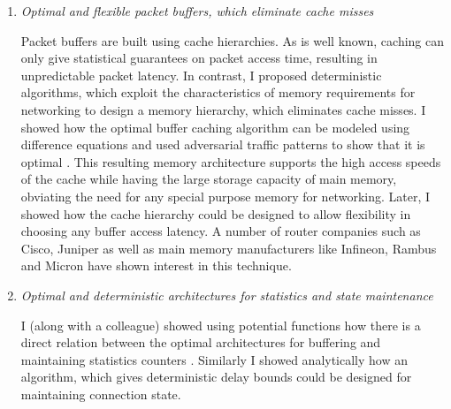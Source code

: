 \documentclass[11pt, a4paper]{article}
\begin{document}
\begin{small}
\begin{enumerate}
\item {\em Optimal and flexible packet buffers, which eliminate cache misses}


Packet buffers are built using cache hierarchies. As is well known, caching
can only give statistical guarantees on packet access time, resulting in unpredictable packet
latency.
In contrast, I proposed deterministic algorithms, which exploit the characteristics 
of memory requirements for networking to design a memory hierarchy, which eliminates cache misses. 
I showed how the optimal buffer caching algorithm can be modeled using difference equations and
used adversarial traffic patterns to show that it is optimal \cite{buffer}.
This resulting memory architecture supports the high access speeds of the cache while
having the large storage capacity of main memory, obviating the need for any special purpose memory
for networking.
Later, I showed how the cache hierarchy could be designed to allow 
flexibility in choosing any buffer access latency.
A number of router companies such as Cisco, Juniper as well as main memory manufacturers 
like Infineon, Rambus and Micron have shown interest in this technique.


\item {\em Optimal and deterministic architectures for statistics and state maintenance}

I (along with a colleague) showed using potential functions how there is 
a direct relation between the optimal architectures for buffering
and maintaining statistics counters \cite{stats}. 
Similarly I showed analytically how an algorithm, which gives deterministic 
delay bounds could be designed for maintaining connection state. 


\end{enumerate}
\end{small}
\end{document}
